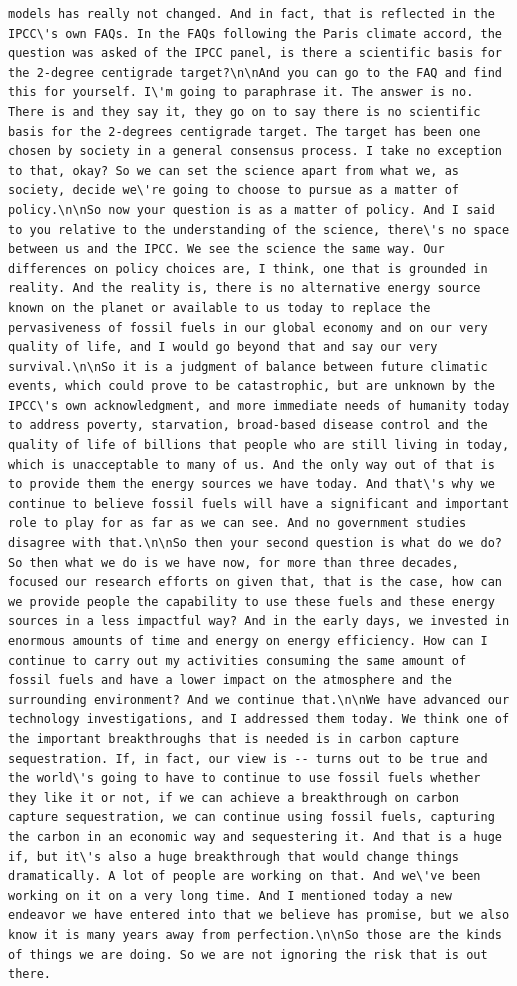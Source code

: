 \documentclass[
  letterpaper,
  DIV=11,
  numbers=noendperiod]{scrreprt}
\begin{document}
\begin{verbatim}
models has really not changed. And in fact, that is reflected in the IPCC\'s own FAQs. In the FAQs following the Paris climate accord, the question was asked of the IPCC panel, is there a scientific basis for the 2-degree centigrade target?\n\nAnd you can go to the FAQ and find this for yourself. I\'m going to paraphrase it. The answer is no. There is and they say it, they go on to say there is no scientific basis for the 2-degrees centigrade target. The target has been one chosen by society in a general consensus process. I take no exception to that, okay? So we can set the science apart from what we, as society, decide we\'re going to choose to pursue as a matter of policy.\n\nSo now your question is as a matter of policy. And I said to you relative to the understanding of the science, there\'s no space between us and the IPCC. We see the science the same way. Our differences on policy choices are, I think, one that is grounded in reality. And the reality is, there is no alternative energy source known on the planet or available to us today to replace the pervasiveness of fossil fuels in our global economy and on our very quality of life, and I would go beyond that and say our very survival.\n\nSo it is a judgment of balance between future climatic events, which could prove to be catastrophic, but are unknown by the IPCC\'s own acknowledgment, and more immediate needs of humanity today to address poverty, starvation, broad-based disease control and the quality of life of billions that people who are still living in today, which is unacceptable to many of us. And the only way out of that is to provide them the energy sources we have today. And that\'s why we continue to believe fossil fuels will have a significant and important role to play for as far as we can see. And no government studies disagree with that.\n\nSo then your second question is what do we do? So then what we do is we have now, for more than three decades, focused our research efforts on given that, that is the case, how can we provide people the capability to use these fuels and these energy sources in a less impactful way? And in the early days, we invested in enormous amounts of time and energy on energy efficiency. How can I continue to carry out my activities consuming the same amount of fossil fuels and have a lower impact on the atmosphere and the surrounding environment? And we continue that.\n\nWe have advanced our technology investigations, and I addressed them today. We think one of the important breakthroughs that is needed is in carbon capture sequestration. If, in fact, our view is -- turns out to be true and the world\'s going to have to continue to use fossil fuels whether they like it or not, if we can achieve a breakthrough on carbon capture sequestration, we can continue using fossil fuels, capturing the carbon in an economic way and sequestering it. And that is a huge if, but it\'s also a huge breakthrough that would change things dramatically. A lot of people are working on that. And we\'ve been working on it on a very long time. And I mentioned today a new endeavor we have entered into that we believe has promise, but we also know it is many years away from perfection.\n\nSo those are the kinds of things we are doing. So we are not ignoring the risk that is out there. 
\end{verbatim}
\end{document}
